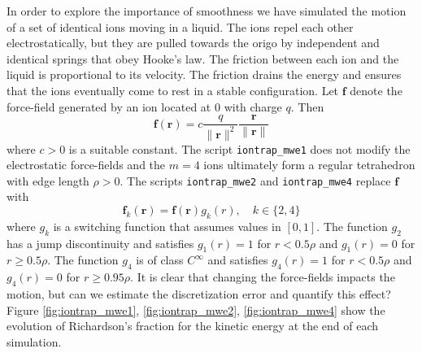 \documentclass[runningheads]{llncs}
\begin{document}
In order to explore the importance of smoothness we have simulated the motion of a set of identical ions moving in a liquid. The ions repel each other electrostatically, but they are pulled towards the origo by independent and identical springs that obey Hooke's law. The friction between each ion and the liquid is proportional to its velocity. The friction drains the energy and ensures that the ions eventually come to rest in a stable configuration. 
Let $\bm{f}$ denote the force-field generated by an ion located at $0$ with charge $q$. Then
\begin{equation}
  \bm{f}(\bm{r}) = c \frac{q}{\|\bm{r}\|^2} \frac{\bm{r}}{\|\bm{r}\|}
\end{equation}
where $c > 0$ is a suitable constant. The script {\tt iontrap\_mwe1} does not modify the electrostatic force-fields and the $m=4$ ions ultimately form a regular tetrahedron with edge length $\rho > 0$.
The scripts {\tt iontrap\_mwe2} and {\tt iontrap\_mwe4} replace $\bm{f}$ with
\begin{equation}
  \bm{f}_k(\bm{r}) = \bm{f}(\bm{r}) g_k(r), \quad k \in \{2, 4\}
\end{equation}
where $g_k$ is a switching function that assumes values in $[0,1]$. The function $g_2$ has a jump discontinuity and satisfies $g_1(r) = 1$ for $r < 0.5 \rho$ and $g_1(r) = 0$ for $r \ge 0.5 \rho$. The function $g_4$ is of class $C^\infty$ and satisfies $g_4(r) = 1$ for $r < 0.5 \rho$ and $g_4(r) = 0$ for $r \ge 0.95 \rho$. It is clear that changing the force-fields impacts the motion, but can we estimate the discretization error and quantify this effect? Figure \ref{fig:iontrap_mwe1}, \ref{fig:iontrap_mwe2}, \ref{fig:iontrap_mwe4} show the evolution of Richardson's fraction for the kinetic energy at the end of each simulation.
\end{document}
